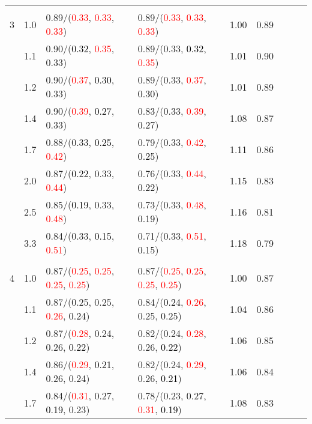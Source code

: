 \documentclass[10pt,a4paper]{report}
\begin{document}
\begin{table}[!htbp]
\begin{center}
{\begin{tabular}{ccllccccc}
			&&&&\\
			3			&1.0&0.89/(\textcolor{red}{0.33}, \textcolor{red}{0.33}, \textcolor{red}{0.33})&0.89/(\textcolor{red}{0.33}, \textcolor{red}{0.33}, \textcolor{red}{0.33})&1.00&0.89\\
			&1.1&0.90/(\textcolor{black}{0.32}, \textcolor{red}{0.35}, 0.33)&0.89/(0.33, \textcolor{black}{0.32}, \textcolor{red}{0.35})&1.01&0.90\\
			&1.2&0.90/(\textcolor{red}{0.37}, \textcolor{black}{0.30}, 0.33)&0.89/(0.33, \textcolor{red}{0.37}, \textcolor{black}{0.30})&1.01&0.89\\
			&1.4&0.90/(\textcolor{red}{0.39}, \textcolor{black}{0.27}, 0.33)&0.83/(0.33, \textcolor{red}{0.39}, \textcolor{black}{0.27})&1.08&0.87\\
			&1.7&0.88/(0.33, \textcolor{black}{0.25}, \textcolor{red}{0.42})&0.79/(0.33, \textcolor{red}{0.42}, \textcolor{black}{0.25})&1.11&0.86\\
			&2.0&0.87/(\textcolor{black}{0.22}, 0.33, \textcolor{red}{0.44})&0.76/(0.33, \textcolor{red}{0.44}, \textcolor{black}{0.22})&1.15&0.83\\
			&2.5&0.85/(\textcolor{black}{0.19}, 0.33, \textcolor{red}{0.48})&0.73/(0.33, \textcolor{red}{0.48}, \textcolor{black}{0.19})&1.16&0.81\\
			&3.3&0.84/(0.33, \textcolor{black}{0.15}, \textcolor{red}{0.51})&0.71/(0.33, \textcolor{red}{0.51}, \textcolor{black}{0.15})&1.18&0.79\\
			&&&&\\
			4			&1.0&0.87/(\textcolor{red}{0.25}, \textcolor{red}{0.25}, \textcolor{red}{0.25}, \textcolor{red}{0.25})&0.87/(\textcolor{red}{0.25}, \textcolor{red}{0.25}, \textcolor{red}{0.25}, \textcolor{red}{0.25})&1.00&0.87\\
			&1.1&0.87/(0.25, 0.25, \textcolor{red}{0.26}, \textcolor{black}{0.24})&0.84/(\textcolor{black}{0.24}, \textcolor{red}{0.26}, 0.25, 0.25)&1.04&0.86\\
			&1.2&0.87/(\textcolor{red}{0.28}, 0.24, 0.26, \textcolor{black}{0.22})&0.82/(0.24, \textcolor{red}{0.28}, 0.26, \textcolor{black}{0.22})&1.06&0.85\\
			&1.4&0.86/(\textcolor{red}{0.29}, \textcolor{black}{0.21}, 0.26, 0.24)&0.82/(0.24, \textcolor{red}{0.29}, 0.26, \textcolor{black}{0.21})&1.06&0.84\\
			&1.7&0.84/(\textcolor{red}{0.31}, 0.27, \textcolor{black}{0.19}, 0.23)&0.78/(0.23, 0.27, \textcolor{red}{0.31}, \textcolor{black}{0.19})&1.08&0.83\\

\end{tabular}}
\end{center}
\end{table}
\end{document}
